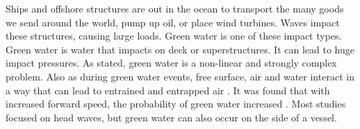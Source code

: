 Ships and offshore structures are out in the ocean to transport the many goods we send around the world, pump up oil, or place wind turbines. Waves impact these structures, causing large loads. Green water is one of these impact types.
Green water is water that impacts on deck or superstructures. It can lead to huge impact pressures. As \citet{Buchner2002} stated, green water is a non-linear and strongly complex problem. Also as during green water events, free surface, air and water interact in a way that can lead to entrained and entrapped air \cite{VanDerEijk2020a}. It was found that with increased forward speed, the probability of green water increased \cite{Greco2012, Hamoudi1998}. Most studies focused on head waves, but green water can also occur on the side of a vessel.


